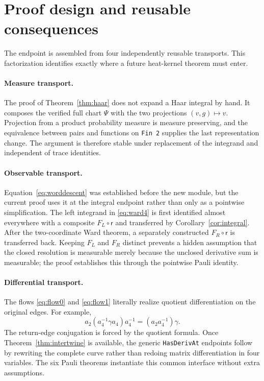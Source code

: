 \documentclass[11pt]{article}
\theoremstyle{definition}
\newcommand{\red}{\mathsf r}
\begin{document}
\section{Proof design and reusable consequences}

The endpoint is assembled from four independently reusable transports.  This
factorization identifies exactly where a future heat-kernel theorem must
enter.

\paragraph{Measure transport.}
The proof of Theorem~\ref{thm:haar} does not expand a Haar integral by hand.
It composes the verified full chart $\Psi$ with the two projections
$(v,g)\mapsto v$.  Projection from a product probability measure is measure
preserving, and the equivalence between pairs and functions on
\texttt{Fin 2} supplies the last representation change.  The argument is
therefore stable under replacement of the integrand and independent of trace
identities.

\paragraph{Observable transport.}
Equation~\eqref{eq:worddescent} was established before the new module, but the
current proof uses it at the integral endpoint rather than only as a
pointwise simplification.  The left integrand in \eqref{eq:ward4} is first
identified almost everywhere with a composite $F_L\circ\red$ and transferred
by Corollary~\ref{cor:integral}.  After the two-coordinate Ward theorem, a
separately constructed $F_R\circ\red$ is transferred back.  Keeping $F_L$
and $F_R$ distinct prevents a hidden assumption that the closed resolution
is measurable merely because the unclosed derivative sum is measurable; the
proof establishes this through the pointwise Pauli identity.

\paragraph{Differential transport.}
The flows \eqref{eq:flow0} and \eqref{eq:flow1} literally realize quotient
differentiation on the original edges.  For example,
\[
 a_2(a_4^{-1}\gamma a_4)a_4^{-1}
   =(a_2a_4^{-1})\gamma.
\]
The return-edge conjugation is forced by the quotient formula.  Once
Theorem~\ref{thm:intertwine} is available, the generic
\texttt{HasDerivAt} endpoints follow by rewriting the complete curve rather
than redoing matrix differentiation in four variables.  The six Pauli
theorems instantiate this common interface without extra assumptions.
\end{document}
